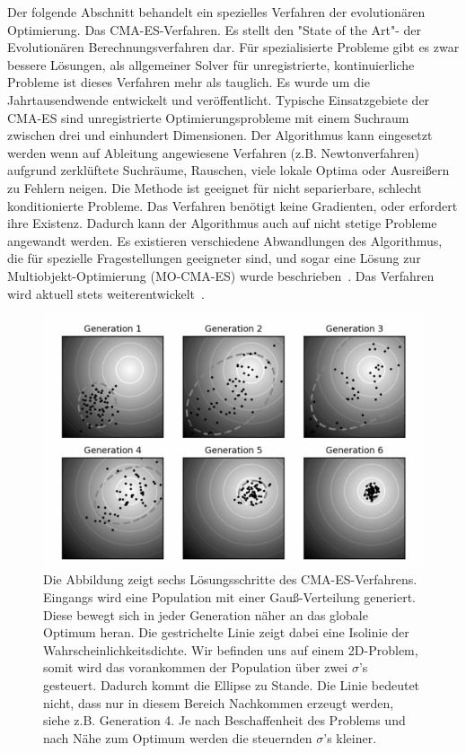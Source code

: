Der folgende Abschnitt behandelt ein spezielles Verfahren der evolutionären Optimierung. Das CMA-ES-Verfahren. Es stellt den "State of the Art"- der Evolutionären Berechnungsverfahren dar. Für spezialisierte Probleme gibt es zwar bessere Lösungen, als allgemeiner Solver für unregistrierte, kontinuierliche Probleme ist dieses Verfahren mehr als tauglich. Es wurde um die Jahrtausendwende entwickelt und veröffentlicht. Typische Einsatzgebiete der CMA-ES sind unregistrierte Optimierungsprobleme mit einem Suchraum zwischen drei und einhundert Dimensionen. Der Algorithmus kann eingesetzt werden wenn auf Ableitung angewiesene Verfahren (z.B. Newtonverfahren) aufgrund zerklüftete Suchräume, Rauschen, viele lokale Optima oder Ausreißern zu Fehlern neigen. Die Methode ist geeignet für nicht separierbare, schlecht konditionierte Probleme. Das Verfahren benötigt keine Gradienten, oder erfordert ihre Existenz. Dadurch kann der Algorithmus auch auf nicht stetige Probleme angewandt werden. Es existieren verschiedene Abwandlungen des Algorithmus, die für spezielle Fragestellungen geeigneter sind, und sogar eine Lösung zur Multiobjekt-Optimierung (MO-CMA-ES) wurde beschrieben~\cite{HansenMOO:1}. Das Verfahren wird aktuell stets weiterentwickelt~\cite{hansen2004ecm,hansen2009bbi}.\\
%
\begin{figure} [ht!]
\centering
         \caption[Konzept direkter Optimierung mittels CMA-ES]{Die Abbildung zeigt sechs Lösungsschritte des CMA-ES-Verfahrens. Eingangs wird eine Population mit einer Gauß-Verteilung generiert. Diese bewegt sich in jeder Generation näher an das globale Optimum heran. Die gestrichelte Linie zeigt dabei eine Isolinie der Wahrscheinlichkeitsdichte. Wir befinden uns auf einem 2D-Problem, somit wird das vorankommen der Population über zwei $\sigma$'s gesteuert. Dadurch kommt die Ellipse zu Stande. Die Linie bedeutet nicht, dass nur in diesem Bereich Nachkommen erzeugt werden, siehe z.B. Generation 4. Je nach Beschaffenheit des Problems und nach Nähe zum Optimum werden die steuernden $\sigma$'s kleiner. \cite{Wiki:Images:1}}
         \label{fig:conecpt_cma.es}
         \vspace{0.5cm}
         \includegraphics[width=\textwidth]{img/CMA-ES_algorithm.png}
%      
\end{figure}
%
%

